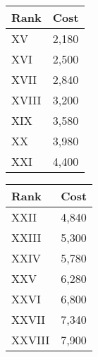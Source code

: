 \begin{minipage}{0.25\textwidth}
    \begin{tabular}{l | l}
        Rank & Cost\\ \hline
        XV & 2,180\\
        XVI & 2,500\\
        XVII & 2,840\\
        XVIII & 3,200\\
        XIX & 3,580\\
        XX & 3,980\\
        XXI & 4,400\\
    \end{tabular}
\end{minipage}
\begin{minipage}{0.25\textwidth}
    \begin{tabular}{l | l}
        Rank & Cost\\ \hline
        XXII & 4,840\\
        XXIII & 5,300\\
        XXIV & 5,780\\
        XXV & 6,280\\
        XXVI & 6,800\\
        XXVII & 7,340\\
        XXVIII & 7,900\\
    \end{tabular}
\end{minipage}











































